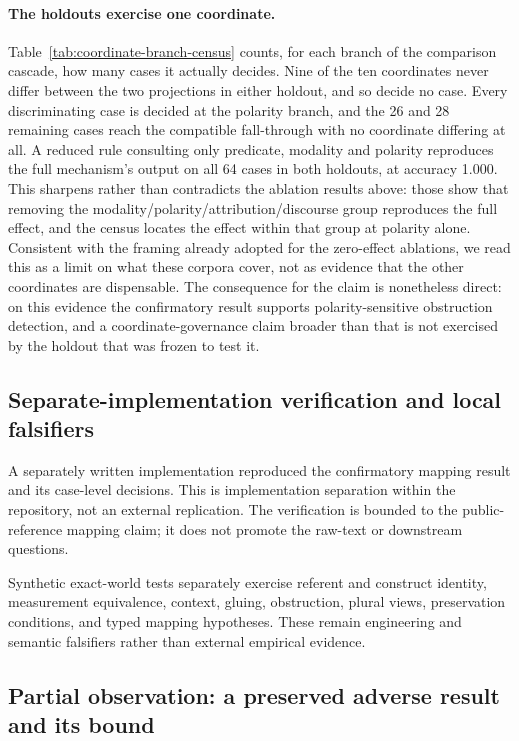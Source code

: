 \paragraph{The holdouts exercise one coordinate.} Table~\ref{tab:coordinate-branch-census}
counts, for each branch of the comparison cascade, how many cases it actually
decides. Nine of the ten coordinates never differ between the two projections in either
holdout, and so decide no case. Every discriminating case is decided at the
polarity branch, and the 26 and 28 remaining cases reach the compatible
fall-through with no coordinate differing at all.
A reduced rule consulting only predicate, modality and polarity reproduces the
full mechanism's output on all 64 cases in both holdouts, at accuracy 1.000.
This sharpens rather than contradicts the ablation results above: those show
that removing the modality/polarity/attribution/discourse group reproduces the
full effect, and the census locates the effect within that group at polarity
alone. Consistent with the framing already adopted for the zero-effect
ablations, we read this as a limit on what these corpora cover, not as evidence
that the other coordinates are dispensable. The consequence for the claim is
nonetheless direct: on this evidence the confirmatory result supports
polarity-sensitive obstruction detection, and a coordinate-governance claim
broader than that is not exercised by the holdout that was frozen to test it.



\subsection{Separate-implementation verification and local falsifiers}

A separately written implementation reproduced the confirmatory mapping
result and its case-level decisions. This is implementation separation within
the repository, not an external replication. The verification is bounded to the
public-reference mapping claim; it does not promote the raw-text or downstream
questions.

Synthetic exact-world tests separately exercise referent and construct
identity, measurement equivalence, context, gluing, obstruction, plural views,
preservation conditions, and typed mapping hypotheses. These remain
engineering and semantic falsifiers rather than external empirical evidence.

\subsection{Partial observation: a preserved adverse result and its bound}

